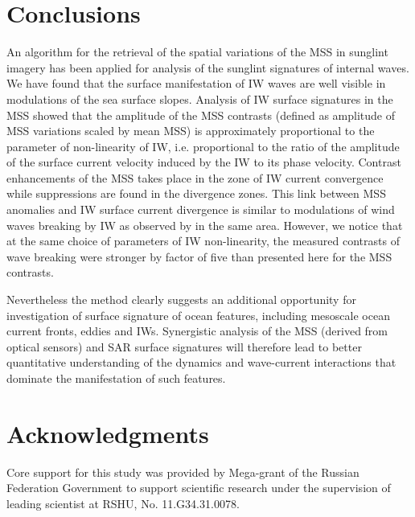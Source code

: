 \documentclass[preprint,authoryear,12pt]{elsarticle}
\begin{document}
\section{Conclusions}

An algorithm for the retrieval of the spatial variations of the MSS in sunglint imagery has been applied for analysis of the sunglint signatures of internal waves. We have found that the surface manifestation of IW waves are well visible in modulations of the sea surface slopes. Analysis of IW surface signatures in the MSS showed that the amplitude of the MSS contrasts (defined as amplitude of MSS variations scaled by mean MSS) is approximately proportional to the parameter of non-linearity of IW, i.e. proportional to the ratio of the amplitude of the surface current velocity induced by the IW to its phase velocity. Contrast enhancements of the MSS takes place in the zone of IW current convergence while suppressions are found in the divergence zones. This link between MSS anomalies and IW surface current divergence is similar to modulations of wind waves breaking by IW as observed by \cite{Dulov1986} in the same area. However, we notice that at the same choice of parameters of IW non-linearity, the measured contrasts of wave breaking were stronger by factor of five than presented here for the MSS contrasts.

Nevertheless the method clearly suggests an additional opportunity for investigation of surface signature of ocean features, including mesoscale ocean current fronts, eddies and IWs. Synergistic analysis of the MSS (derived from optical sensors) and SAR surface signatures will therefore lead to better quantitative understanding of the dynamics and wave-current interactions that dominate the manifestation of such features.


\section{Acknowledgments}

Core support for this study was provided by Mega-grant of the Russian Federation Government to support scientific research under the supervision of leading scientist at RSHU, No. 11.G34.31.0078.



\end{document}
